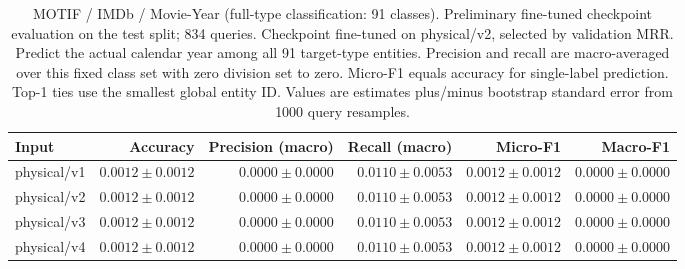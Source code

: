 \begin{table}[t]
\centering
\small
\begin{tabular}{lrrrrr}
\toprule
Input & Accuracy & Precision (macro) & Recall (macro) & Micro-F1 & Macro-F1 \\
\midrule
physical/v1 & $0.0012 \pm 0.0012$ & $0.0000 \pm 0.0000$ & $0.0110 \pm 0.0053$ & $0.0012 \pm 0.0012$ & $0.0000 \pm 0.0000$ \\
physical/v2 & $0.0012 \pm 0.0012$ & $0.0000 \pm 0.0000$ & $0.0110 \pm 0.0053$ & $0.0012 \pm 0.0012$ & $0.0000 \pm 0.0000$ \\
physical/v3 & $0.0012 \pm 0.0012$ & $0.0000 \pm 0.0000$ & $0.0110 \pm 0.0053$ & $0.0012 \pm 0.0012$ & $0.0000 \pm 0.0000$ \\
physical/v4 & $0.0012 \pm 0.0012$ & $0.0000 \pm 0.0000$ & $0.0110 \pm 0.0053$ & $0.0012 \pm 0.0012$ & $0.0000 \pm 0.0000$ \\
\bottomrule
\end{tabular}
\caption{MOTIF / IMDb / Movie-Year (full-type classification: 91 classes). Preliminary fine-tuned checkpoint evaluation on the test split; 834 queries. Checkpoint fine-tuned on physical/v2, selected by validation MRR. Predict the actual calendar year among all 91 target-type entities. Precision and recall are macro-averaged over this fixed class set with zero division set to zero. Micro-F1 equals accuracy for single-label prediction. Top-1 ties use the smallest global entity ID. Values are estimates plus/minus bootstrap standard error from 1000 query resamples.}
\label{tab:motif-movie_year-classification}
\end{table}
